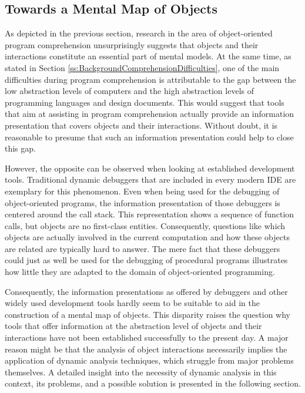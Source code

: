 \subsection{Towards a Mental Map of Objects}
\label{ss:BackgroundComprehensionMentalMap}
As depicted in the previous section, research in the area of object-oriented program comprehension unsurprisingly suggests that objects and their interactions constitute an essential part of mental models.
At the same time, as stated in Section \ref{ss:BackgroundComprehensionDifficulties}, one of the main difficulties during program comprehension is attributable to the gap between the low abstraction levels of computers and the high abstraction levels of programming languages and design documents.
This would suggest that tools that aim at assisting in program comprehension actually provide an information presentation that covers objects and their interactions.
Without doubt, it is reasonable to presume that such an information presentation could help to close this gap.

However, the opposite can be observed when looking at established development tools.
Traditional dynamic debuggers that are included in every modern IDE are exemplary for this phenomenon.
Even when being used for the debugging of object-oriented programs, the information presentation of those debuggers is centered around the call stack.
This representation shows a sequence of function calls, but objects are no first-class entities.
Consequently, questions like which objects are actually involved in the current computation and how these objects are related are typically hard to answer.
The mere fact that these debuggers could just as well be used for the debugging of procedural programs illustrates how little they are adapted to the domain of object-oriented programming.

Consequently, the information presentations as offered by debuggers and other widely used development tools hardly seem to be suitable to aid in the construction of a mental map of objects.
This disparity raises the question why tools that offer information at the abstraction level of objects and their interactions have not been established successfully to the present day.
A major reason might be that the analysis of object interactions necessarily implies the application of dynamic analysis techniques, which struggle from major problems themselves.
A detailed insight into the necessity of dynamic analysis in this context, its problems, and a possible solution is presented in the following section.

